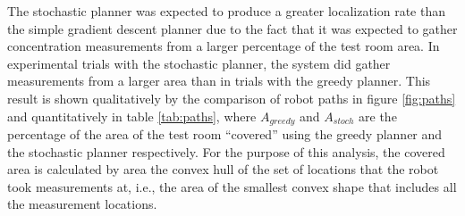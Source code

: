 \documentclass[submit]{aiaa-pretty-modified}
\begin{document}
The stochastic planner was expected to produce a greater localization
rate than the simple gradient descent planner due to the fact that it
was expected to gather concentration measurements from a larger
percentage of the test room area.  In experimental trials with the
stochastic planner, the system did gather measurements from a larger
area than in trials with the greedy planner.  This result is shown
qualitatively by the comparison of robot paths in figure \ref{fig:paths} and
quantitatively in table \ref{tab:paths}, where $A_{greedy}$ and
$A_{stoch}$ are the percentage of the area of the test room ``covered''
using the greedy planner and the stochastic planner respectively.  For
the purpose of this analysis, the covered area is calculated by area the convex hull
of the set of locations that the robot took measurements at, i.e., the area of
the smallest convex shape that includes all the measurement locations.
\end{document}
